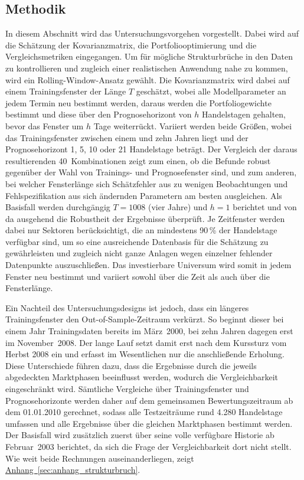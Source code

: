 \documentclass[a4paper, 12pt]{article}
\begin{document}
\subsection{Methodik}\label{subsec:rollfenster}
In diesem Abschnitt wird das Untersuchungsvorgehen vorgestellt.
Dabei wird auf die Schätzung der Kovarianzmatrix, die Portfoliooptimierung und die Vergleichsmetriken eingegangen.
Um für mögliche Strukturbrüche in den Daten zu kontrollieren und zugleich einer realistischen Anwendung nahe zu kommen, wird ein Rolling-Window-Ansatz gewählt.
Die Kovarianzmatrix wird dabei auf einem Trainingsfenster der Länge $T$ geschätzt, wobei alle Modellparameter an jedem Termin neu bestimmt werden, daraus werden die Portfoliogewichte bestimmt und diese über den Prognosehorizont von $h$ Handelstagen gehalten, bevor das Fenster um $h$ Tage weiterrückt.
Variiert werden beide Größen, wobei das Trainingsfenster zwischen einem und zehn Jahren liegt und der Prognosehorizont 1, 5, 10 oder 21 Handelstage beträgt.
Der Vergleich der daraus resultierenden 40~Kombinationen zeigt zum einen, ob die Befunde robust gegenüber der Wahl von Trainings- und Prognosefenster sind, und zum anderen, bei welcher Fensterlänge sich Schätzfehler aus zu wenigen Beobachtungen und Fehlspezifikation aus sich ändernden Parametern am besten ausgleichen.
Als Basisfall werden durchgängig $T = 1008$ (vier Jahre) und $h = 1$ berichtet und von da ausgehend die Robustheit der Ergebnisse überprüft.
Je Zeitfenster werden dabei nur Sektoren berücksichtigt, die an mindestens 90\,\% der Handelstage verfügbar sind, um so eine ausreichende Datenbasis für die Schätzung zu gewährleisten und zugleich nicht ganze Anlagen wegen einzelner fehlender Datenpunkte auszuschließen.
Das investierbare Universum wird somit in jedem Fenster neu bestimmt und variiert sowohl über die Zeit als auch über die Fensterlänge.

Ein Nachteil des Untersuchungsdesigns ist jedoch, dass ein längeres Trainingsfenster den Out-of-Sample-Zeitraum verkürzt.
So beginnt dieser bei einem Jahr Trainingsdaten bereits im März~2000, bei zehn Jahren dagegen erst im November~2008.
Der lange Lauf setzt damit erst nach dem Kurssturz vom Herbst 2008 ein und erfasst im Wesentlichen nur die anschließende Erholung.
Diese Unterschiede führen dazu, dass die Ergebnisse durch die jeweils abgedeckten Marktphasen beeinflusst werden, wodurch die Vergleichbarkeit eingeschränkt wird.
Sämtliche Vergleiche über Trainingsfenster und Prognosehorizonte werden daher auf dem gemeinsamen Bewertungszeitraum ab dem 01.01.2010 gerechnet, sodass alle Testzeiträume rund 4.280 Handelstage umfassen und alle Ergebnisse über die gleichen Marktphasen bestimmt werden.
Der Basisfall wird zusätzlich zuerst über seine volle verfügbare Historie ab Februar~2003 berichtet, da sich die Frage der Vergleichbarkeit dort nicht stellt.
Wie weit beide Rechnungen auseinanderliegen, zeigt \hyperref[sec:anhang_strukturbruch]{Anhang~\ref*{sec:anhang_strukturbruch}}.
\end{document}
